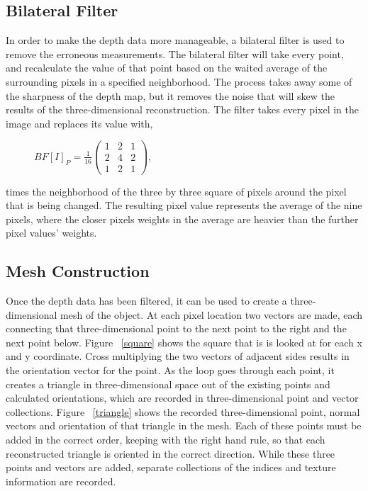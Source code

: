\documentclass[pdftex,10.5pt]{report}
\begin{document}
\subsection{Bilateral Filter}
In order to make the depth data more manageable, a bilateral filter is used to remove the erroneous measurements. The bilateral filter will take every point, and recalculate the value of that point based on the waited average of the surrounding pixels in a specified neighborhood. The process takes away some of the sharpness of the depth map, but it removes the noise that will skew the results of the three-dimensional reconstruction. The filter takes every pixel in the image and replaces its value with,
\begin{figure}[H]
	\centering
	$BF[I]_{P} = \frac{1}{16} \left( 
	\begin{array}{ccc}
		1 & 2 & 1 \\
		2 & 4 & 2 \\
		1 & 2 & 1 
	\end{array}  \right)$,
\end{figure}
\noindent times the neighborhood of the three by three square of pixels around the pixel that is being changed. The resulting pixel value represents the average of the nine pixels, where the closer pixels weights in the average are heavier than the further pixel values' weights.  \cite{filter}

\subsection{Mesh Construction}
Once the depth data has been filtered, it can be used to create a three-dimensional mesh of the object. At each pixel location two vectors are made, each connecting that three-dimensional point to the next point to the right and the next point below. Figure ~\ref{square} shows the square that is is looked at for each x and y coordinate. Cross multiplying the two vectors of adjacent sides results in the orientation vector for the point. As the loop goes through each point, it creates a triangle in three-dimensional space out of the existing points and calculated orientations, which are recorded in three-dimensional point and vector collections. Figure ~\ref{triangle} shows the recorded three-dimensional point, normal vectors and orientation of that triangle in the mesh. Each of these points must be added in the correct order, keeping with the right hand rule, so that each reconstructed triangle is oriented in the correct direction. While these three points and vectors are added, separate collections of the indices and texture information are recorded. 
\end{document}
